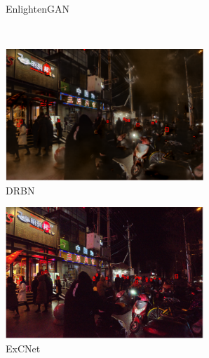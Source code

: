 \documentclass[letterpaper,12pt]{article}
\begin{document}
\begin{figure}[htbp]
\begin{subfigure}{0.22\textwidth}
			\captionsetup{font=scriptsize}
			\caption{EnlightenGAN}
			\label{fig: DARK_FACE_h}  
		\end{subfigure}\\
		\begin{subfigure}{0.22\textwidth}
			\includegraphics[width=\linewidth]{DARK_FACE/DRBN}
			\captionsetup{font=scriptsize}
			\caption{DRBN}
			\label{fig:DARK_FACE_i}  
		\end{subfigure}    
		\begin{subfigure}{0.22\textwidth}
			\includegraphics[width=\linewidth]{DARK_FACE/ExCNet}
			\captionsetup{font=scriptsize}
			\caption{ExCNet}
			\label{fig: DARK_FACE_j}
		\end{subfigure}
		\begin{subfigure}{0.22\textwidth}

\end{subfigure}
\end{figure}
\end{document}
